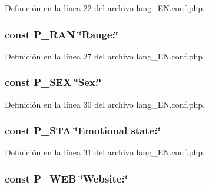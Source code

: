 Definición en la línea 22 del archivo lang\-\_\-\-E\-N.\-conf.\-php.

\hypertarget{lang__EN_8conf_8php_a5fca0022c5481060364d39a3812ac604}{
\subsubsection[{P\-\_\-\-R\-A\-N}]{\setlength{\rightskip}{0pt plus 5cm}const P\-\_\-\-R\-A\-N \char`\"{}Range\-:\char`\"{}}}\label{lang__EN_8conf_8php_a5fca0022c5481060364d39a3812ac604}


Definición en la línea 27 del archivo lang\-\_\-\-E\-N.\-conf.\-php.

\hypertarget{lang__EN_8conf_8php_a695823c4efbb40f67bf068989d78c024}{
\subsubsection[{P\-\_\-\-S\-E\-X}]{\setlength{\rightskip}{0pt plus 5cm}const P\-\_\-\-S\-E\-X \char`\"{}Sex\-:\char`\"{}}}\label{lang__EN_8conf_8php_a695823c4efbb40f67bf068989d78c024}


Definición en la línea 30 del archivo lang\-\_\-\-E\-N.\-conf.\-php.

\hypertarget{lang__EN_8conf_8php_a77097762c49f00afdf8fe7fd23b3498c}{
\subsubsection[{P\-\_\-\-S\-T\-A}]{\setlength{\rightskip}{0pt plus 5cm}const P\-\_\-\-S\-T\-A \char`\"{}Emotional state\-:\char`\"{}}}\label{lang__EN_8conf_8php_a77097762c49f00afdf8fe7fd23b3498c}


Definición en la línea 31 del archivo lang\-\_\-\-E\-N.\-conf.\-php.

\hypertarget{lang__EN_8conf_8php_ade9836b8897b65809f548b7781e977e2}{
\subsubsection[{P\-\_\-\-W\-E\-B}]{\setlength{\rightskip}{0pt plus 5cm}const P\-\_\-\-W\-E\-B \char`\"{}Website\-:\char`\"{}}}\label{lang__EN_8conf_8php_ade9836b8897b65809f548b7781e977e2}


